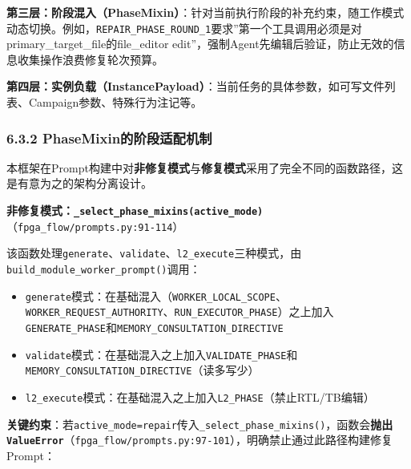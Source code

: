 \textbf{第三层：阶段混入（PhaseMixin）}：针对当前执行阶段的补充约束，随工作模式动态切换。例如，\texttt{REPAIR\_PHASE\_ROUND\_1}要求''第一个工具调用必须是对primary\_target\_file的file\_editor
edit''，强制Agent先编辑后验证，防止无效的信息收集操作浪费修复轮次预算。

\textbf{第四层：实例负载（InstancePayload）}：当前任务的具体参数，如可写文件列表、Campaign参数、特殊行为注记等。

\subsubsection{6.3.2
PhaseMixin的阶段适配机制}\label{phasemixinux7684ux9636ux6bb5ux9002ux914dux673aux5236}

本框架在Prompt构建中对\textbf{非修复模式}与\textbf{修复模式}采用了完全不同的函数路径，这是有意为之的架构分离设计。

\textbf{非修复模式：\texttt{\_select\_phase\_mixins(active\_mode)}}（\texttt{fpga\_flow/prompts.py:91-114}）

该函数处理\texttt{generate}、\texttt{validate}、\texttt{l2\_execute}三种模式，由\texttt{build\_module\_worker\_prompt()}调用：

\begin{itemize}
\tightlist
\item
  \texttt{generate}模式：在基础混入（\texttt{WORKER\_LOCAL\_SCOPE}、\texttt{WORKER\_REQUEST\_AUTHORITY}、\texttt{RUN\_EXECUTOR\_PHASE}）之上加入\texttt{GENERATE\_PHASE}和\texttt{MEMORY\_CONSULTATION\_DIRECTIVE}
\item
  \texttt{validate}模式：在基础混入之上加入\texttt{VALIDATE\_PHASE}和\texttt{MEMORY\_CONSULTATION\_DIRECTIVE}（读多写少）
\item
  \texttt{l2\_execute}模式：在基础混入之上加入\texttt{L2\_PHASE}（禁止RTL/TB编辑）
\end{itemize}

\textbf{关键约束}：若\texttt{active\_mode=\textquotesingle{}repair\textquotesingle{}}传入\texttt{\_select\_phase\_mixins()}，函数会\textbf{抛出\texttt{ValueError}}（\texttt{fpga\_flow/prompts.py:97-101}），明确禁止通过此路径构建修复Prompt：

\begin{Shaded}
\begin{Highlighting}[]
\OperatorTok{==} \NormalTok{:}
     \NormalTok{(}
\NormalTok{    )}
\end{Highlighting}
\end{Shaded}

